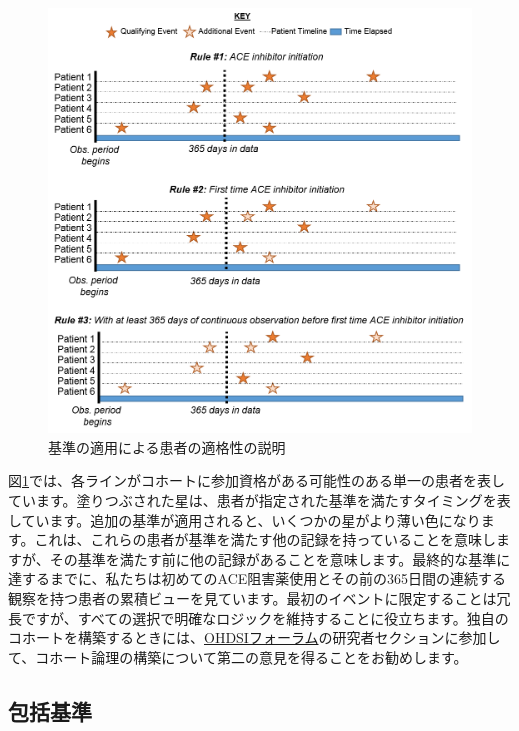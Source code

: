 \documentclass[
  11pt]{book}
\theoremstyle{definition}
\theoremstyle{definition}
\theoremstyle{definition}
\theoremstyle{definition}
\theoremstyle{remark}
\begin{document}
\begin{figure}

{\centering \includegraphics[width=1\linewidth]{images/Cohorts/EarliestEventExplained} 

}

\caption{基準の適用による患者の適格性の説明}\label{fig:EarliestEventExplained}
\end{figure}

図\ref{fig:EarliestEventExplained}では、各ラインがコホートに参加資格がある可能性のある単一の患者を表しています。塗りつぶされた星は、患者が指定された基準を満たすタイミングを表しています。追加の基準が適用されると、いくつかの星がより薄い色になります。これは、これらの患者が基準を満たす他の記録を持っていることを意味しますが、その基準を満たす前に他の記録があることを意味します。最終的な基準に達するまでに、私たちは初めてのACE阻害薬使用とその前の365日間の連続する観察を持つ患者の累積ビューを見ています。最初のイベントに限定することは冗長ですが、すべての選択で明確なロジックを維持することに役立ちます。独自のコホートを構築するときには、\href{http://forums.ohdsi.org}{OHDSIフォーラム}の研究者セクションに参加して、コホート論理の構築について第二の意見を得ることをお勧めします。

\subsection{包括基準}\label{ux5305ux62ecux57faux6e96}
\end{document}
